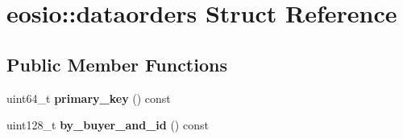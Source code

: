 \hypertarget{structeosio_1_1dataorders}{}\section{eosio\+:\+:dataorders Struct Reference}
\label{structeosio_1_1dataorders}
\subsection*{Public Member Functions}
\begin{DoxyCompactItemize}
\item 
\mbox{\label{structeosio_1_1dataorders_aa81343a5d394684b3dea74b9af02c49e}} 
uint64\+\_\+t {\bfseries primary\+\_\+key} () const
\item 
\mbox{\label{structeosio_1_1dataorders_a63eccc1ad17813cafa8e68c1aa715f51}} 
uint128\+\_\+t {\bfseries by\+\_\+buyer\+\_\+and\+\_\+id} () const
\end{DoxyCompactItemize}
